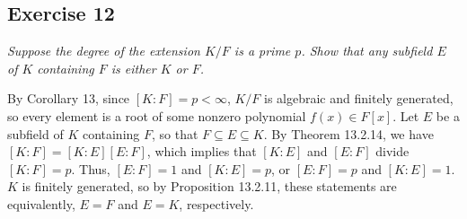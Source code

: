 \subsection*{Exercise 12}
\begin{framed}
\textit{Suppose the degree of the extension $K/F$ is a prime $p$. Show that any subfield $E$ of $K$ containing $F$ is either $K$ or $F$.}
\end{framed}

By Corollary 13, since $[K:F] = p < \infty$, $K/F$ is algebraic and finitely generated, so every element is a root of some nonzero polynomial $f(x) \in F[x]$. Let $E$ be a subfield of $K$ containing $F$, so that $F \subseteq E \subseteq K$. By Theorem 13.2.14, we have $[K:F] = [K:E][E:F]$, which implies that $[K:E]$ and $[E:F]$ divide $[K:F] = p$. Thus, $[E:F] = 1$ and $[K:E] = p$, or $[E:F] = p$ and $[K:E] = 1$. $K$ is finitely generated, so by Proposition 13.2.11, these statements are equivalently, $E = F$ and $E = K$, respectively.